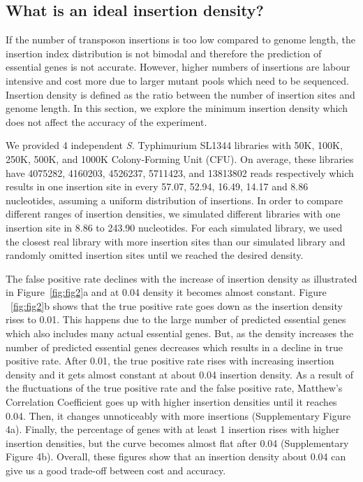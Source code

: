 \documentclass[12pt,letterpaper]{article}
\begin{document}
\subsection{What is an ideal insertion density?}
If the number of transposon insertions is too low compared to genome length, the insertion index distribution is not bimodal and therefore the prediction of essential genes is not accurate. However, higher numbers of insertions are labour intensive and cost more due to larger mutant pools which need to be sequenced. Insertion density is defined as the ratio between the number of insertion sites and genome length. In this section, we explore the minimum insertion density which does not affect the accuracy of the experiment.

We provided 4 independent \textit{S.} Typhimurium SL1344 libraries with 50K, 100K, 250K, 500K, and 1000K Colony-Forming Unit (CFU). On average, these libraries have 4075282, 4160203, 4526237, 5711423, and 13813802 reads respectively which results in one insertion site in every 57.07, 52.94, 16.49, 14.17 and 8.86 nucleotides, assuming a uniform distribution of insertions. In order to compare different ranges of insertion densities, we simulated different libraries with one insertion site in 8.86 to 243.90 nucleotides. For each simulated library, we used the closest real library with more insertion sites than our simulated library and randomly omitted insertion sites until we reached the desired density.

The false positive rate declines with the increase of insertion density as illustrated in Figure~\ref{fig:fig2}a and at 0.04 density it becomes almost constant. Figure ~\ref{fig:fig2}b shows that the true positive rate goes down as the insertion density rises to 0.01. This happens due to the large number of predicted essential genes which also includes many actual essential genes. But, as the density increases the number of predicted essential genes decreases which results in a decline in true positive rate. After 0.01, the true positive rate rises with increasing insertion density and it gets almost constant at about 0.04 insertion density. As a result of the fluctuations of the true positive rate and the false positive rate, Matthew's Correlation Coefficient goes up with higher insertion densities until it reaches 0.04. Then, it changes unnoticeably with more insertions (Supplementary Figure 4a). Finally, the percentage of genes with at least 1 insertion rises with higher insertion densities, but the curve becomes almost flat after 0.04 (Supplementary Figure 4b). Overall, these figures show that an insertion density about 0.04 can give us a good trade-off between cost and accuracy.
\end{document}
